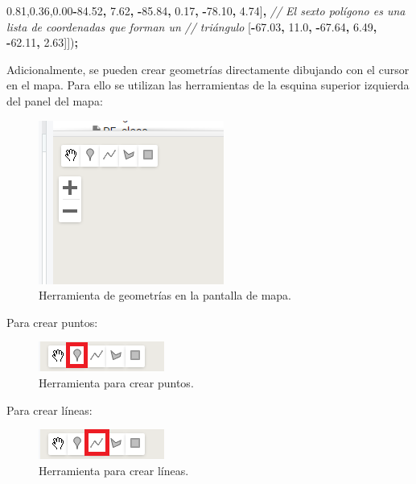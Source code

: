 \documentclass[
  12pt,
  letterpaper,
  twoside]{book}
\newenvironment{Shaded}{\begin{snugshade}}{\end{snugshade}}
\newcommand{\CommentTok}[1]{\textcolor[rgb]{0.56,0.35,0.01}{\textit{#1}}}
\newcommand{\FloatTok}[1]{\textcolor[rgb]{0.00,0.00,0.81}{#1}}
\newcommand{\NormalTok}[1]{#1}
\newcommand{\OperatorTok}[1]{\textcolor[rgb]{0.81,0.36,0.00}{\textbf{#1}}}
\begin{document}
\begin{Shaded}
\begin{Highlighting}[]
\NormalTok{    [}\OperatorTok{{-}}\FloatTok{84.52}\OperatorTok{,} \FloatTok{7.62}\OperatorTok{,}         
     \OperatorTok{{-}}\FloatTok{85.84}\OperatorTok{,} \FloatTok{0.17}\OperatorTok{,}
     \OperatorTok{{-}}\FloatTok{78.10}\OperatorTok{,} \FloatTok{4.74}\NormalTok{]}\OperatorTok{,}
    \CommentTok{// El sexto polígono es una lista de coordenadas que forman un }
    \CommentTok{// triángulo}
\NormalTok{    [}\OperatorTok{{-}}\FloatTok{67.03}\OperatorTok{,} \FloatTok{11.0}\OperatorTok{,}         
     \OperatorTok{{-}}\FloatTok{67.64}\OperatorTok{,} \FloatTok{6.49}\OperatorTok{,}
     \OperatorTok{{-}}\FloatTok{62.11}\OperatorTok{,} \FloatTok{2.63}\NormalTok{]])}\OperatorTok{;}
\end{Highlighting}
\end{Shaded}

Adicionalmente, se pueden crear geometrías directamente dibujando con el cursor en el mapa. Para ello se utilizan las herramientas de la esquina superior izquierda del panel del mapa:

\begin{figure}

{\centering \includegraphics[width=0.3\linewidth]{Img/geometrias} 

}

\caption{Herramienta de geometrías en la pantalla de mapa.}\label{fig:unnamed-chunk-53}
\end{figure}

Para crear puntos:

\begin{figure}

{\centering \includegraphics[width=0.2\linewidth]{Img/punto} 

}

\caption{Herramienta para crear puntos.}\label{fig:unnamed-chunk-54}
\end{figure}

Para crear líneas:

\begin{figure}

{\centering \includegraphics[width=0.2\linewidth]{Img/linea} 

}

\caption{Herramienta para crear líneas.}\label{fig:unnamed-chunk-55}
\end{figure}
\end{document}
